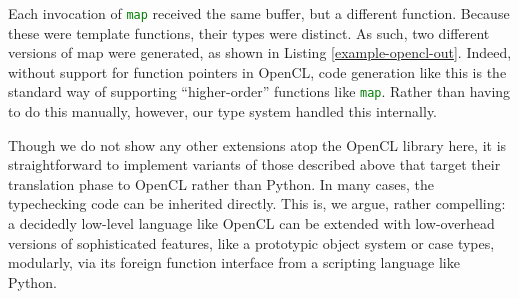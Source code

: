 \documentclass[preprint,10pt]{sigplanconf}
\newcommand{\lip}[1]{\lstinline[language=Python,basicstyle=\ttfamily\small,deletendkeywords={tuple,buffer,map}]{#1}}
\begin{document}
Each invocation of \lip{map} received the same buffer, but a different function. Because these were template functions, their types were distinct. As such, two different versions of map were generated, as shown in Listing \ref{example-opencl-out}. Indeed, without support for function pointers in OpenCL, code generation like this is the standard way of supporting ``higher-order'' functions like \lip{map}. Rather than having to do this manually, however, our type system handled this internally. 

Though we do not show any other extensions atop the OpenCL library here, it is straightforward to implement variants of those described above that target their translation phase to OpenCL rather than Python. In many cases, the typechecking code can be inherited directly. This is, we argue, rather compelling: a decidedly low-level language like OpenCL can be extended with low-overhead versions of sophisticated features, like a prototypic object system or case types, modularly, via its foreign function interface from a scripting language like Python.
\end{document}
